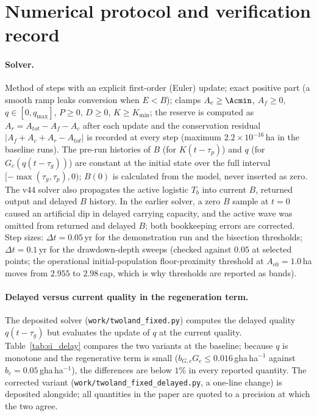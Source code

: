 \section{Numerical protocol and verification record}\label{si:numerics}

\paragraph{Solver.} Method of steps with an explicit first-order (Euler) update; exact positive part (a smooth ramp leaks conversion when $E<B$); clamps $A_c\ge\Acmin$, $A_f\ge0$, $q\in[0,q_{\max}]$, $P\ge0$, $D\ge0$, $K\ge K_{\min}$; the reserve is computed as $A_r=A_{tot}-A_f-A_c$ after each update and the conservation residual $|A_f+A_c+A_r-A_{tot}|$ is recorded at every step (maximum $2.2\times10^{-16}$\,ha in the baseline runs). The pre-run histories of $B$ (for $K(t-\tau_p)$) and $q$ (for $G_c(q(t-\tau_g))$) are constant at the initial state over the full interval $[-\max(\tau_g,\tau_p),0)$; $B(0)$ is calculated from the model, never inserted as zero. The v44 solver also propagates the active logistic $T_b$ into current $B$, returned output and delayed $B$ history. In the earlier solver, a zero $B$ sample at $t=0$ caused an artificial dip in delayed carrying capacity, and the active wave was omitted from returned and delayed $B$; both bookkeeping errors are corrected. Step sizes: $\Delta t=0.05$\,yr for the demonstration run and the bisection thresholds; $\Delta t=0.1$\,yr for the drawdown-depth sweeps (checked against $0.05$ at selected points; the operational initial-population floor-proximity threshold at $A_{c0}=1.0$\,ha moves from $2.955$ to $2.98$\,cap, which is why thresholds are reported as bands).

\paragraph{Delayed versus current quality in the regeneration term.} The deposited solver (\texttt{work/twoland\_fixed.py}) computes the delayed quality $q(t-\tau_g)$ but evaluates the update of $q$ at the current quality. Table~\ref{tab:si_delay} compares the two variants at the baseline; because $q$ is monotone and the regenerative term is small ($b_{G,c}G_c\le0.016$\,gha\,ha$^{-1}$ against $b_c=0.05$\,gha\,ha$^{-1}$), the differences are below $1\%$ in every reported quantity. The corrected variant (\texttt{work/twoland\_fixed\_delayed.py}, a one-line change) is deposited alongside; all quantities in the paper are quoted to a precision at which the two agree.

